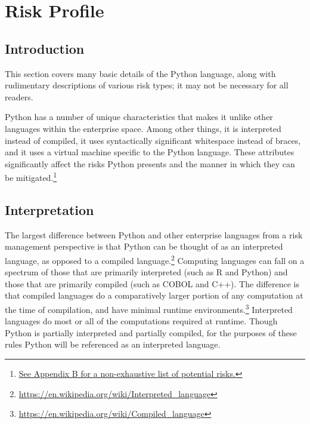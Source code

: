 \section{Risk Profile}
 
\thispagestyle{section_start_style}
 
    \subsection*{Introduction}

        \begin{tcolorbox}
            This section covers many basic details of the Python language, along with rudimentary descriptions of various risk types; it may not be necessary for all readers.
        \end{tcolorbox}

        Python has a number of unique characteristics that makes it unlike other languages within the enterprise space. Among other things, it is interpreted instead of compiled, it uses syntactically significant whitespace instead of braces, and it uses a virtual machine specific to the Python language. These attributes significantly affect the risks Python presents and the manner in which they can be mitigated.\footnote{\hyperref[sec:appendix_b]{See Appendix B for a non-exhaustive list of potential risks.}}

    \subsection{Interpretation}

        The largest difference between Python and other enterprise languages from a risk management perspective is that Python can be thought of as an interpreted language, as opposed to a compiled language.\footnote{\url{https://en.wikipedia.org/wiki/Interpreted_language}} Computing languages can fall on a spectrum of those that are primarily interpreted (such as R and Python) and those that are primarily compiled (such as COBOL and C++). The difference is that compiled languages do a comparatively larger portion of any computation at the time of compilation, and have minimal runtime environments.\footnote{\url{https://en.wikipedia.org/wiki/Compiled_language}} Interpreted languages do most or all of the computations required at runtime. Though Python is partially interpreted and partially compiled, for the purposes of these rules Python will be referenced as an interpreted language.

